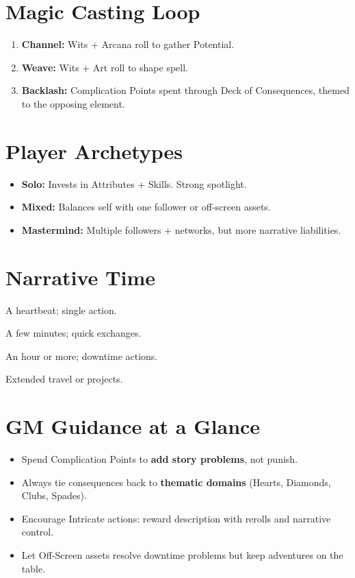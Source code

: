\documentclass[12pt]{book}
\begin{document}
\section*{Magic Casting Loop}
\begin{enumerate}
  \item \textbf{Channel:} Wits + Arcana roll to gather Potential.  
  \item \textbf{Weave:} Wits + Art roll to shape spell.  
  \item \textbf{Backlash:} Complication Points spent through Deck of Consequences, themed to the opposing element.  
\end{enumerate}

\section*{Player Archetypes}
\begin{itemize}
  \item \textbf{Solo:} Invests in Attributes + Skills. Strong spotlight.  
  \item \textbf{Mixed:} Balances self with one follower or off-screen assets.  
  \item \textbf{Mastermind:} Multiple followers + networks, but more narrative liabilities.  
\end{itemize}

\section*{Narrative Time}
\begin{description}[leftmargin=2cm]
  \item[A Moment] A heartbeat; single action.  
  \item[Some Time] A few minutes; quick exchanges.  
  \item[Significant Time] An hour or more; downtime actions.  
  \item[Days] Extended travel or projects.  
\end{description}

\section*{GM Guidance at a Glance}
\begin{itemize}
  \item Spend Complication Points to \textbf{add story problems}, not punish.  
  \item Always tie consequences back to \textbf{thematic domains} (Hearts, Diamonds, Clubs, Spades).  
  \item Encourage Intricate actions: reward description with rerolls and narrative control.  
  \item Let Off-Screen assets resolve downtime problems but keep adventures on the table.  
\end{itemize}
\end{document}

